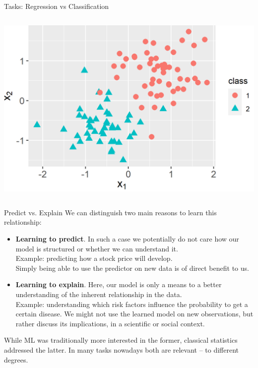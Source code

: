 \begin{vbframe}{Tasks: Regression vs Classification}
\begin{columns}
\begin{column}{0.5\textwidth}
  \begin{center}
    \includegraphics[width=\textwidth]{figure/ml-basics-supervised-classif-task.png} 
  \end{center}
\end{column}    
\end{columns}    
  
\end{vbframe}

\begin{vbframe}{Predict vs. Explain}
We can distinguish two main reasons to learn this relationship:


\begin{itemize}
    \item \textbf{Learning to predict}. In such a case we potentially do not care how
        our model is structured or whether we can understand it.\\
        Example: predicting how a stock price will develop. \\
        Simply being able to use the predictor on new data is of direct benefit to us.

    \item \textbf{Learning to explain}. Here, our model is only a means to 
        a better understanding of the inherent relationship in the data.\\
        Example: understanding which risk factors influence the probability to 
        get a certain disease.
        We might not use the learned model on new observations, but rather 
        discuss its implications, in a scientific or social context.

\end{itemize}  

While ML was traditionally more interested in the former, classical statistics
addressed the latter. In many tasks nowadays both are relevant -- to different degrees.

\end{vbframe}
  
